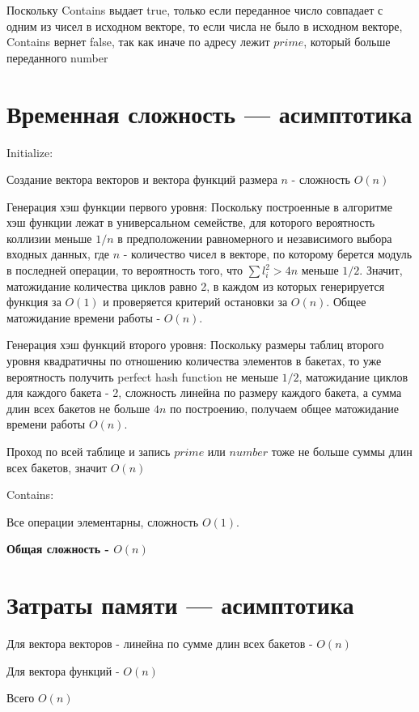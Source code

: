 \documentclass{article}
\begin{document}
Поскольку Contains выдает true, только если переданное число совпадает с одним из чисел в исходном векторе, то если числа не было в исходном векторе, Contains вернет false, так как иначе по адресу лежит $prime$, который больше переданного number

\section{Временная сложность — асимптотика}

Initialize:

Создание вектора векторов и вектора функций размера $n$ - сложность $O(n)$

Генерация хэш функции первого уровня:
Поскольку построенные в алгоритме хэш функции лежат в универсальном семействе, для которого вероятность коллизии меньше $1/n$ в предположении равномерного и независимого выбора входных данных, где $n$ - количество чисел в векторе, по которому берется модуль в последней операции, то вероятность того, что $\sum l_i^2 > 4n$ меньше $1/2$. Значит, матожидание количества циклов равно 2, в каждом из которых генерируется функция за $O(1)$ и проверяется критерий остановки за $O(n)$. Общее матожидание времени работы - $O(n)$.

Генерация хэш функций второго уровня: 
Поскольку размеры таблиц второго уровня квадратичны по отношению количества элементов в бакетах, то уже вероятность получить perfect hash function не меньше $1/2$, матожидание циклов для каждого бакета - 2, сложность линейна по размеру каждого бакета, а сумма длин всех бакетов не больше $4n$ по построению, получаем общее матожидание времени работы $O(n)$.

Проход по всей таблице и запись $prime$ или $number$ тоже не больше суммы длин всех бакетов, значит $O(n)$

Contains:

Все операции элементарны, сложность $O(1)$.

\textbf{Общая сложность - $O(n)$}

\section{Затраты памяти — асимптотика}

Для вектора векторов - линейна по сумме длин всех бакетов - $O(n)$

Для вектора функций - $O(n)$

Всего $O(n)$
\end{document}
